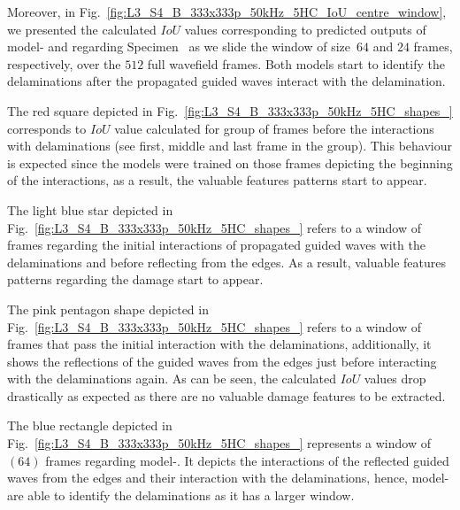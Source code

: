Moreover, in Fig.~\ref{fig:L3_S4_B_333x333p_50kHz_5HC_IoU_centre_window}, we presented the calculated \(IoU\) values corresponding to predicted outputs of model- and  regarding Specimen~ as we slide the window of size~\(64\) and \(24\) frames, respectively, over the \(512\) full wavefield frames.
Both models start to identify the delaminations after the propagated guided waves interact with the delamination.

The red square depicted in Fig.~\ref{fig:L3_S4_B_333x333p_50kHz_5HC_shapes_} corresponds to \(IoU\) value calculated for group of frames before the interactions with delaminations (see first, middle and last frame in the group).
This behaviour is expected since the models were trained on those frames depicting the beginning of the interactions, as a result, the valuable features patterns start to appear.

The light blue star depicted in Fig.~\ref{fig:L3_S4_B_333x333p_50kHz_5HC_shapes_} refers to a window of frames regarding the initial interactions of propagated guided waves with the delaminations and before reflecting from the edges.
As a result, valuable features patterns regarding the damage start to appear.

The pink pentagon shape depicted in Fig.~\ref{fig:L3_S4_B_333x333p_50kHz_5HC_shapes_} refers to a window of frames that pass the initial interaction with the delaminations, additionally, it shows the reflections of the guided waves from the edges just before interacting with the delaminations again.
As can be seen, the calculated \(IoU\) values drop drastically as expected as there are no valuable damage features to be extracted. 

The blue rectangle depicted in Fig.~\ref{fig:L3_S4_B_333x333p_50kHz_5HC_shapes_} represents a window of \((64)\) frames regarding model-.
It depicts the interactions of the reflected guided waves from the edges and their interaction with the delaminations, hence, model- are able to identify the delaminations as it has a larger window.

